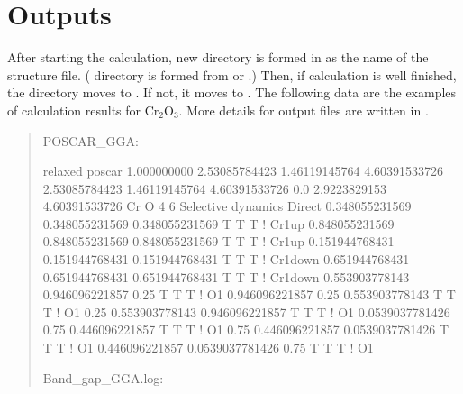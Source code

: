\documentclass[letterpaper,10pt,english]{sphinxmanual}
\begin{document}
\section{Outputs}
\label{\detokenize{Overview/Overview:outputs}}
After starting the calculation, new directory is formed in  as the name of the structure
file. ( directory is formed from  or .)
Then, if calculation is well finished, the directory moves to . If not, it moves to .
The following data are the examples of calculation results for Cr$_{\text{2}}$O$_{\text{3}}$.
More details for output files are written in {\hyperref[\detokenize{Output/Output::doc}]{}}.
\begin{quote}

POSCAR\_GGA:

\begin{sphinxVerbatim}[commandchars=\\\{\}]
relaxed poscar
1.000000000
    2.53085784423    1.46119145764    4.60391533726
    \PYGZhy{}2.53085784423    1.46119145764    4.60391533726
    0.0    \PYGZhy{}2.9223829153    4.60391533726
    Cr    O
    4    6
Selective dynamics
Direct
    0.348055231569    0.348055231569    0.348055231569  T  T  T ! Cr1\PYGZus{}up
    0.848055231569    0.848055231569    0.848055231569  T  T  T ! Cr1\PYGZus{}up
    0.151944768431    0.151944768431    0.151944768431  T  T  T ! Cr1\PYGZus{}down
    0.651944768431    0.651944768431    0.651944768431  T  T  T ! Cr1\PYGZus{}down
    0.553903778143    0.946096221857    0.25  T  T  T ! O1
    0.946096221857    0.25    0.553903778143  T  T  T ! O1
    0.25    0.553903778143    0.946096221857  T  T  T ! O1
    0.0539037781426    0.75    0.446096221857  T  T  T ! O1
    0.75    0.446096221857    0.0539037781426  T  T  T ! O1
    0.446096221857    0.0539037781426    0.75  T  T  T ! O1
\end{sphinxVerbatim}

Band\_gap\_GGA.log:

\begin{sphinxVerbatim}[commandchars=\\\{\}]
         

               
               


\end{sphinxVerbatim}
\end{quote}
\end{document}
